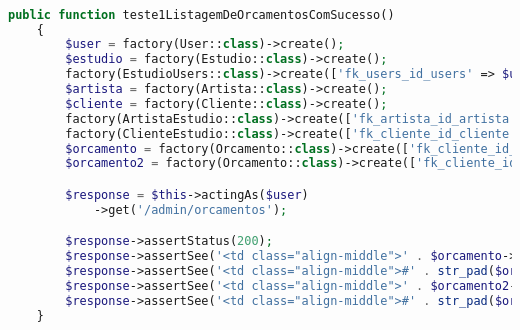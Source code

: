 \begin{lstlisting}[language=PHP, caption= Script do teste teste1ListagemDeOrcamentosComSucesso,label={code:teste1ListagemDeOrcamentosComSucesso}]

public function teste1ListagemDeOrcamentosComSucesso()
    {
        $user = factory(User::class)->create();
        $estudio = factory(Estudio::class)->create();
        factory(EstudioUsers::class)->create(['fk_users_id_users' => $user->id, 'fk_estudio_id_estudio' => $estudio->id_estudio]);
        $artista = factory(Artista::class)->create();
        $cliente = factory(Cliente::class)->create();
        factory(ArtistaEstudio::class)->create(['fk_artista_id_artista' => $artista->id_artista, 'fk_estudio_id_estudio' => $estudio->id_estudio]);
        factory(ClienteEstudio::class)->create(['fk_cliente_id_cliente' => $cliente->id_cliente, 'fk_estudio_id_estudio' => $estudio->id_estudio]);
        $orcamento = factory(Orcamento::class)->create(['fk_cliente_id_cliente' => $cliente->id_cliente, 'fk_artista_id_artista' => $artista->id_artista, 'fk_estudio_id_estudio' => $estudio->id_estudio, 'fk_orcamento_status_id_orcamento_status' => 1]);
        $orcamento2 = factory(Orcamento::class)->create(['fk_cliente_id_cliente' => $cliente->id_cliente, 'fk_artista_id_artista' => $artista->id_artista, 'fk_estudio_id_estudio' => $estudio->id_estudio, 'fk_orcamento_status_id_orcamento_status' => 1]);

        $response = $this->actingAs($user)
            ->get('/admin/orcamentos');

        $response->assertStatus(200);
        $response->assertSee('<td class="align-middle">' . $orcamento->tatuagem_nome . '</td>', $escaped = false);
        $response->assertSee('<td class="align-middle">#' . str_pad($orcamento->id_orcamento, 5, '0', STR_PAD_LEFT) . '</td>', $escaped = false);
        $response->assertSee('<td class="align-middle">' . $orcamento2->tatuagem_nome . '</td>', $escaped = false);
        $response->assertSee('<td class="align-middle">#' . str_pad($orcamento2->id_orcamento, 5, '0', STR_PAD_LEFT) . '</td>', $escaped = false);
    }
    
\end{lstlisting}

